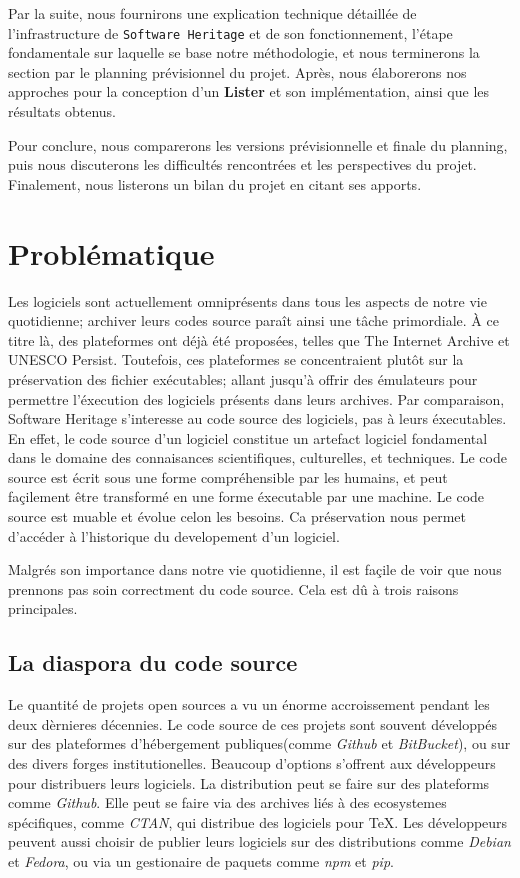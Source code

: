 \documentclass[12pt,a4paper]{report}
\theoremstyle{definition}
\begin{document}
Par la suite, nous fournirons une explication technique détaillée de l'infrastructure de \texttt{Software Heritage} et de son fonctionnement, l'étape fondamentale sur laquelle se base notre méthodologie, et nous terminerons la section par le planning prévisionnel du projet. Après, nous élaborerons nos approches pour la conception d'un \textbf{Lister} et son implémentation, ainsi que les résultats obtenus.

Pour conclure, nous comparerons les versions prévisionnelle et finale du planning, puis nous discuterons les difficultés rencontrées et les perspectives du projet. Finalement, nous listerons un bilan du projet en citant ses apports.


\chapter{Problématique}
Les logiciels sont actuellement omniprésents dans tous les aspects de notre
vie quotidienne; archiver leurs codes source paraît ainsi une tâche primordiale. À ce titre là, des plateformes ont déjà été proposées, telles que The Internet Archive
et UNESCO Persist. Toutefois, ces plateformes se concentraient plutôt sur la
préservation des fichier exécutables; allant jusqu'à offrir des émulateurs pour permettre l'éxecution des logiciels présents dans leurs archives.
Par comparaison, Software Heritage s'interesse au code source des logiciels, pas à leurs éxecutables. En effet, le code source d'un logiciel constitue un artefact logiciel fondamental dans le domaine des connaisances scientifiques, culturelles, et techniques. Le code source est écrit sous une forme compréhensible par les humains, et peut façilement être transformé en une forme éxecutable par une machine. Le code source est muable et évolue celon les besoins. Ca préservation nous permet d'accéder à l'historique du developement d'un logiciel. 

Malgrés son importance dans notre vie quotidienne, il est façile de voir que nous prennons pas soin correctment du code source. Cela est dû à trois raisons principales.

\section{La diaspora du code source}
Le quantité de projets open sources a vu un énorme accroissement pendant les deux dèrnieres décennies. Le code source de ces projets sont souvent développés sur des plateformes d'hébergement publiques(comme \textit{Github} et \textit{BitBucket}), ou sur des divers forges institutionelles.
Beaucoup d'options s'offrent aux développeurs pour distribuers leurs logiciels. La distribution peut se faire sur des plateforms comme \textit{Github}. Elle peut se faire via des archives liés à des ecosystemes spécifiques, comme \textit{CTAN}, qui distribue des logiciels pour TeX. Les développeurs peuvent aussi choisir de publier leurs logiciels sur des distributions comme \textit{Debian} et \textit{Fedora}, ou via un gestionaire de paquets comme \textit{npm} et \textit{pip}.
\end{document}
